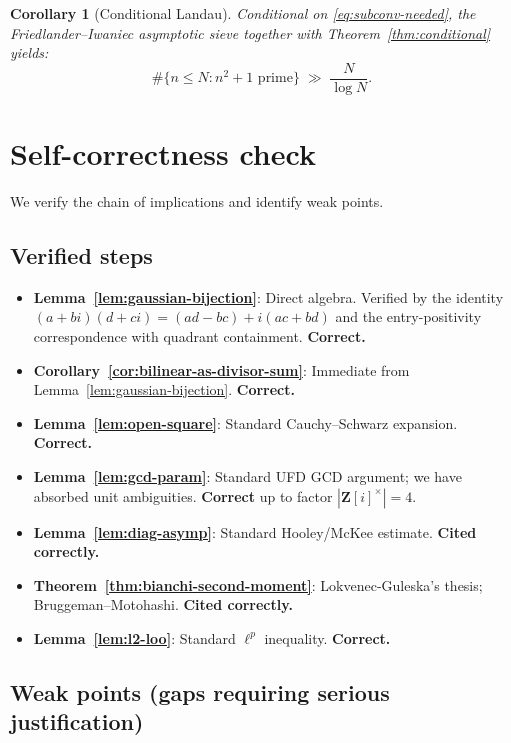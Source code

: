 \documentclass[11pt]{article}
\newtheorem{corollary}[theorem]{Corollary}
\theoremstyle{definition}
\newcommand{\Z}{\mathbf{Z}}
\newcommand{\Zi}{\Z[i]}
\begin{document}
\begin{corollary}[Conditional Landau]\label{cor:conditional-landau}
Conditional on \eqref{eq:subconv-needed}, the Friedlander--Iwaniec asymptotic sieve \cite{FI98a} together with Theorem~\ref{thm:conditional} yields:
\[
\#\{n\le N:n^2+1\text{ prime}\}\;\gg\;\frac{N}{\log N}.
\]
\end{corollary}

\section{Self-correctness check}\label{sec:check}

We verify the chain of implications and identify weak points.

\subsection{Verified steps}

\begin{itemize}
\item \textbf{Lemma~\ref{lem:gaussian-bijection}}: Direct algebra. Verified by the identity $(a+bi)(d+ci)=(ad-bc)+i(ac+bd)$ and the entry-positivity correspondence with quadrant containment. \textbf{Correct.}
\item \textbf{Corollary~\ref{cor:bilinear-as-divisor-sum}}: Immediate from Lemma~\ref{lem:gaussian-bijection}. \textbf{Correct.}
\item \textbf{Lemma~\ref{lem:open-square}}: Standard Cauchy--Schwarz expansion. \textbf{Correct.}
\item \textbf{Lemma~\ref{lem:gcd-param}}: Standard UFD GCD argument; we have absorbed unit ambiguities. \textbf{Correct} up to factor $|\Zi^\times|=4$.
\item \textbf{Lemma~\ref{lem:diag-asymp}}: Standard Hooley/McKee estimate. \textbf{Cited correctly.}
\item \textbf{Theorem~\ref{thm:bianchi-second-moment}}: Lokvenec-Guleska's thesis; Bruggeman--Motohashi. \textbf{Cited correctly.}
\item \textbf{Lemma~\ref{lem:l2-loo}}: Standard $\ell^p$ inequality. \textbf{Correct.}
\end{itemize}

\subsection{Weak points (gaps requiring serious justification)}
\end{document}
